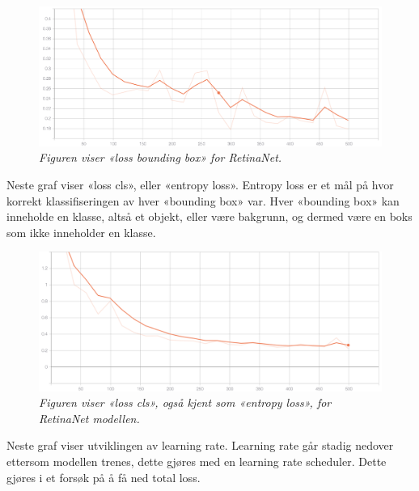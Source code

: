 \begin{figure}[H]
\begin{center} 
\includegraphics[scale=0.35]{figures/loss_box_reg_retinanet_3}
\caption{\small \sl Figuren viser «loss bounding box» for RetinaNet. \label{fig:loss_box_reg_retinanet}}
\end{center}
\end{figure}

Neste graf viser «loss cls», eller «entropy loss». Entropy loss er et mål på hvor korrekt klassifiseringen av hver «bounding box» var. Hver «bounding box» kan inneholde en klasse, altså et objekt, eller være bakgrunn, og dermed være en boks som ikke inneholder en klasse.

\begin{figure}[H]
\begin{center} 
\includegraphics[scale=0.35]{figures/loss_cls_retinanet_4}
\caption{\small \sl Figuren viser «loss cls», også kjent som «entropy loss», for RetinaNet modellen. \label{fig:loss_cls_retinanet}}
\end{center}
\end{figure}

Neste graf viser utviklingen av learning rate. Learning rate går stadig nedover ettersom modellen trenes, dette gjøres med en learning rate scheduler. Dette gjøres i et forsøk på å få ned total loss.

